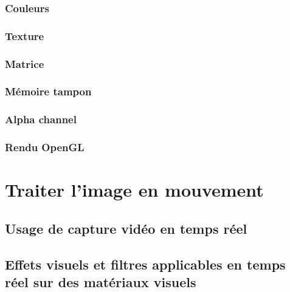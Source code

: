 \documentclass[
]{book}
\begin{document}
\hypertarget{couleurs}{%
\subsection{Couleurs}\label{couleurs}}

\hypertarget{texture}{%
\subsection{Texture}\label{texture}}

\hypertarget{matrice}{%
\subsection{Matrice}\label{matrice}}

\hypertarget{muxe9moire-tampon}{%
\subsection{Mémoire tampon}\label{muxe9moire-tampon}}

\hypertarget{alpha-channel}{%
\subsection{Alpha channel}\label{alpha-channel}}

\hypertarget{rendu-opengl}{%
\subsection{Rendu OpenGL}\label{rendu-opengl}}

\hypertarget{traiter}{%
\chapter{Traiter l'image en mouvement}\label{traiter}}

\hypertarget{usage-de-capture-viduxe9o-en-temps-ruxe9el}{%
\section{Usage de capture vidéo en temps réel}\label{usage-de-capture-viduxe9o-en-temps-ruxe9el}}

\hypertarget{effets-visuels-et-filtres-applicables-en-temps-ruxe9el-sur-des-matuxe9riaux-visuels}{%
\section{Effets visuels et filtres applicables en temps réel sur des matériaux visuels}\label{effets-visuels-et-filtres-applicables-en-temps-ruxe9el-sur-des-matuxe9riaux-visuels}}
\end{document}
